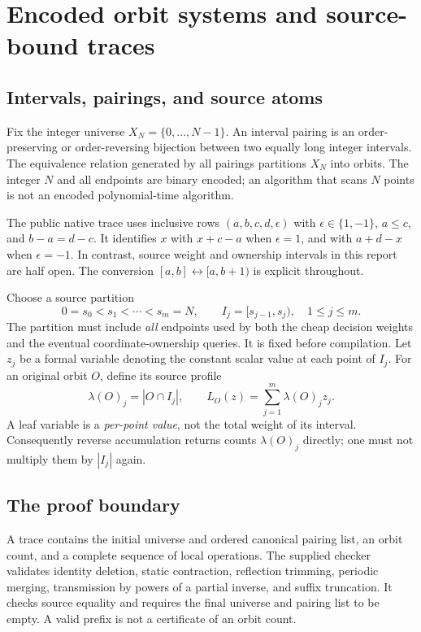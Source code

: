 \documentclass[11pt]{article}
\theoremstyle{definition}\newtheorem{definition}[theorem]{Definition}
\theoremstyle{remark}\newtheorem{remark}[theorem]{Remark}
\begin{document}
\section{Encoded orbit systems and source-bound traces}
\label{sec:model}

\subsection{Intervals, pairings, and source atoms}
Fix the integer universe $X_N=\{0,\ldots,N-1\}$. An interval pairing is an
order-preserving or order-reversing bijection between two equally long integer
intervals. The equivalence relation generated by all pairings partitions $X_N$
into orbits. The integer $N$ and all endpoints are binary encoded; an algorithm
that scans $N$ points is not an encoded polynomial-time algorithm.

The public native trace uses inclusive rows $(a,b,c,d,\epsilon)$ with
$\epsilon\in\{1,-1\}$, $a\le c$, and $b-a=d-c$. It identifies $x$ with
$x+c-a$ when $\epsilon=1$, and with $a+d-x$ when $\epsilon=-1$.
In contrast, source weight and ownership intervals in this report are half open.
The conversion $[a,b]\leftrightarrow[a,b+1)$ is explicit throughout.

Choose a source partition
\[
 0=s_0<s_1<\cdots<s_m=N,\qquad I_j=[s_{j-1},s_j),\quad 1\le j\le m.
\]
The partition must include \emph{all} endpoints used by both the cheap decision
weights and the eventual coordinate-ownership queries. It is fixed before
compilation. Let $z_j$ be a formal variable denoting the constant scalar value at
each point of $I_j$. For an original orbit $O$, define its source profile
\begin{equation}
 \lambda(O)_j=|O\cap I_j|,\qquad
 L_O(z)=\sum_{j=1}^m\lambda(O)_jz_j.
 \label{eq:profile}
\end{equation}
A leaf variable is a \emph{per-point value}, not the total weight of its interval.
Consequently reverse accumulation returns counts $\lambda(O)_j$ directly; one
must not multiply them by $|I_j|$ again.

\subsection{The proof boundary}
A trace contains the initial universe and ordered canonical pairing list, an
orbit count, and a complete sequence of local operations. The supplied checker
validates identity deletion, static contraction, reflection trimming, periodic
merging, transmission by powers of a partial inverse, and suffix truncation.
It checks source equality and requires the final universe and pairing list to
be empty. A valid prefix is not a certificate of an orbit count.
\end{document}
